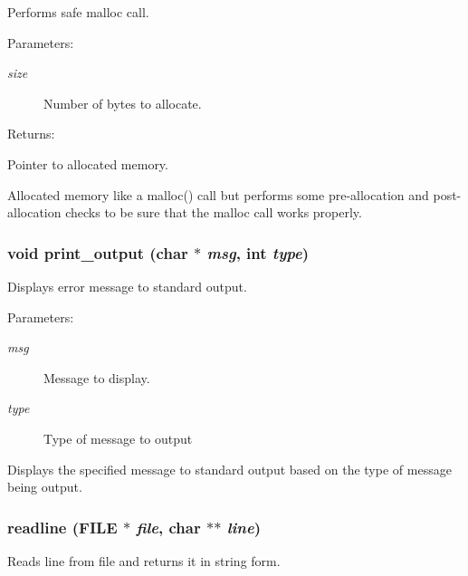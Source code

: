 Performs safe malloc call.

\begin{Desc}
\item[Parameters: ]\par
\begin{description}
\item[{\em 
size}]Number of bytes to allocate.\end{description}
\end{Desc}
\begin{Desc}
\item[Returns: ]\par
Pointer to allocated memory.\end{Desc}
Allocated memory like a malloc() call but performs some pre-allocation and post-allocation checks to be sure that the malloc call works properly. 
\subsubsection{\setlength{\rightskip}{0pt plus 5cm}void print\_\-output (char $\ast$ {\em msg}, int {\em type})}\label{util_8h_a1}


Displays error message to standard output.

\begin{Desc}
\item[Parameters: ]\par
\begin{description}
\item[{\em 
msg}]Message to display. \item[{\em 
type}]Type of message to output\end{description}
\end{Desc}
Displays the specified message to standard output based on the type of message being output. 
\subsubsection{ readline (FILE $\ast$ {\em file}, char $\ast$$\ast$ {\em line})}\label{util_8h_a7}


Reads line from file and returns it in string form.

